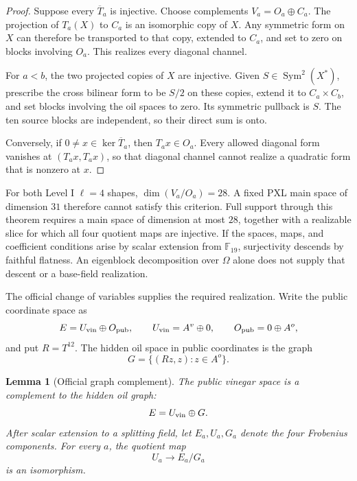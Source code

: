 \documentclass[11pt]{article}
\newtheorem{lemma}[lemma]{Lemma}
\newcommand{\F}{\mathbb F}
\newcommand{\Sym}{\operatorname{Sym}}
\begin{document}
\begin{proof}
Suppose every $\overline T_a$ is injective.  Choose complements
$V_a=O_a\oplus C_a$.  The projection of $T_a(X)$ to $C_a$ is an isomorphic
copy of $X$.  Any symmetric form on $X$ can therefore be transported to
that copy, extended to $C_a$, and set to zero on blocks involving $O_a$.
This realizes every diagonal channel.

For $a<b$, the two projected copies of $X$ are injective.  Given
$S\in\Sym^2(X^*)$, prescribe the cross bilinear form to be $S/2$ on these
copies, extend it to $C_a\times C_b$, and set blocks involving the oil spaces
to zero.  Its symmetric pullback is $S$.  The ten source blocks are
independent, so their direct sum is onto.

Conversely, if $0\ne x\in\ker\overline T_a$, then $T_ax\in O_a$.
Every allowed diagonal form vanishes at $(T_ax,T_ax)$, so that diagonal
channel cannot realize a quadratic form that is nonzero at $x$.
\end{proof}

For both Level I $\ell=4$ shapes, $\dim(V_a/O_a)=28$.  A fixed PXL main
space of dimension $31$ therefore cannot satisfy this criterion.  Full
support through this theorem requires a main space of dimension at most
$28$, together with a realizable slice for which all four quotient maps are
injective.  If the spaces, maps, and coefficient conditions arise by scalar
extension from $\F_{19}$, surjectivity descends by faithful flatness.  An
eigenblock decomposition over $\Omega$ alone does not supply that descent or
a base-field realization.

The official change of variables supplies the required realization.  Write
the public coordinate space as
\[
 E=U_{\rm vin}\oplus O_{\rm pub},
 \qquad U_{\rm vin}=A^v\oplus0,
 \qquad O_{\rm pub}=0\oplus A^o,
\]
and put $R=T^{12}$.  The hidden oil space in public coordinates is the graph
\begin{equation}
 G=\{(Rz,z):z\in A^o\}.                              \label{eq:pxl-hidden-oil-graph}
\end{equation}

\begin{lemma}[Official graph complement]
\label{lem:pxl-graph-complement}
The public vinegar space is a complement to the hidden oil graph:
\begin{equation}
 E=U_{\rm vin}\oplus G.                              \label{eq:pxl-graph-complement}
\end{equation}
After scalar extension to a splitting field, let $E_a,U_a,G_a$ denote the
four Frobenius components.  For every $a$, the quotient map
\begin{equation}
 U_a\longrightarrow E_a/G_a                         \label{eq:pxl-split-quotient-iso}
\end{equation}
is an isomorphism.
\end{lemma}
\end{document}
